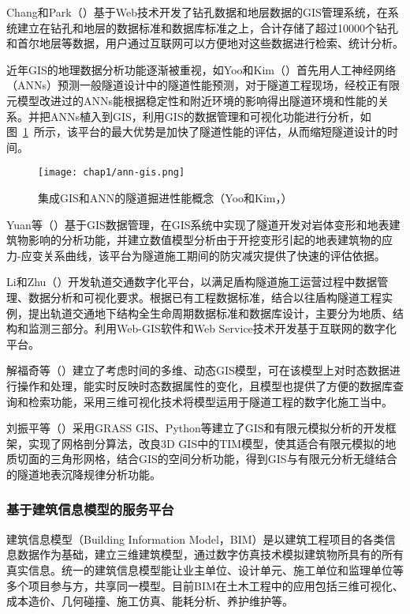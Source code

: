 Chang和Park（\citeyear{chang2004development}）基于Web技术开发了钻孔数据和地层数据的GIS管理系统，在系统建立在钻孔和地层的数据标准和数据库标准之上，合计存储了超过10000个钻孔和首尔地层等数据，用户通过互联网可以方便地对这些数据进行检索、统计分析。

近年GIS的地理数据分析功能逐渐被重视，如Yoo和Kim（\citeyear{yoo2007tunneling}）首先用人工神经网络（ANNs）预测一般隧道设计中的隧道性能预测，对于隧道工程现场，经校正有限元模型改进过的ANNs能根据稳定性和附近环境的影响得出隧道环境和性能的关系。并把ANNs植入到GIS，利用GIS的数据管理和可视化功能进行分析，如图~\ref{fig:集成GIS和ANN的隧道掘进性能概念}~所示，该平台的最大优势是加快了隧道性能的评估，从而缩短隧道设计的时间。

\begin{figure}[!h]
	\centering
	\texttt{[image: chap1/ann-gis.png]}
	\caption{集成GIS和ANN的隧道掘进性能概念（Yoo和Kim，\citeyear{yoo2007tunneling}）}
	\label{fig:集成GIS和ANN的隧道掘进性能概念}
\end{figure}

Yuan等（\citeyear{yuan2012study}）基于GIS数据管理，在GIS系统中实现了隧道开发对岩体变形和地表建筑物影响的分析功能，并建立数值模型分析由于开挖变形引起的地表建筑物的应力-应变关系曲线，该平台为隧道施工期间的防灾减灾提供了快速的评估依据。

Li和Zhu（\citeyear{li2013development}）开发轨道交通数字化平台，以满足盾构隧道施工运营过程中数据管理、数据分析和可视化要求。根据已有工程数据标准，结合以往盾构隧道工程实例，提出轨道交通地下结构全生命周期数据标准和数据库设计，主要分为地质、结构和监测三部分。利用Web-GIS软件和Web Service技术开发基于互联网的数字化平台。

解福奇等（\citeyear{解福奇2009时态}）建立了考虑时间的多维、动态GIS模型，可在该模型上对时态数据进行操作和处理，能实时反映时态数据属性的变化，且模型也提供了方便的数据库查询和检索功能，采用三维可视化技术将模型运用于隧道工程的数字化施工当中。

刘振平等（\citeyear{刘振平20173d}）采用GRASS GIS、Python等建立了GIS和有限元模拟分析的开发框架，实现了网格剖分算法，改良3D GIS中的TIM模型，使其适合有限元模拟的地质切面的三角形网格，结合GIS的空间分析功能，得到GIS与有限元分析无缝结合的隧道地表沉降规律分析功能。

\subsubsection{基于建筑信息模型的服务平台}

建筑信息模型（Building Information Model，BIM）是以建筑工程项目的各类信息数据作为基础，建立三维建筑模型，通过数字仿真技术模拟建筑物所具有的所有真实信息。统一的建筑信息模型能让业主单位、设计单元、施工单位和监理单位等多个项目参与方，共享同一模型。目前BIM在土木工程中的应用包括三维可视化、成本造价、几何碰撞、施工仿真、能耗分析、养护维护等。

